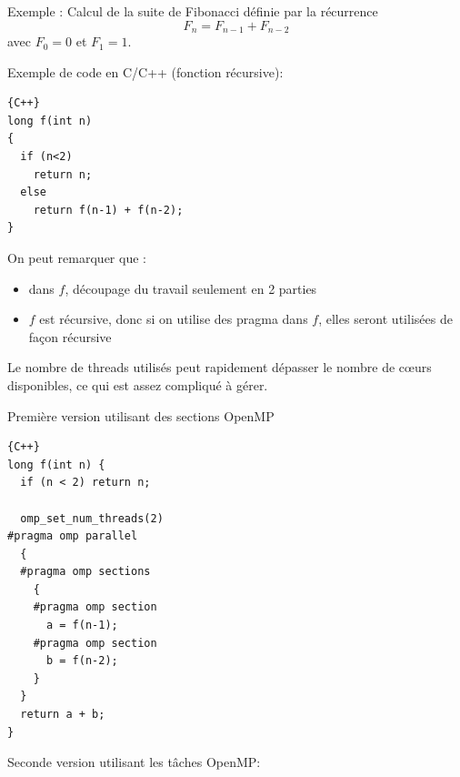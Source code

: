 \documentclass{beamer}
\begin{document}
\begin{frame}[fragile]
Exemple : Calcul de la suite de Fibonacci définie par la récurrence
$$
F_n = F_{n-1} + F_{n-2}
$$
avec $F_0 = 0$ et $F_1 = 1$.

\vfill
Exemple de code en C/C++ (fonction récursive):
 

\begin{lstlisting}{C++}
long f(int n)
{
  if (n<2)
    return n;
  else
    return f(n-1) + f(n-2);
}
\end{lstlisting}

\end{frame}

\begin{frame}[fragile]
\vfill
	On peut remarquer que :
	\begin{itemize}
		\item dans $f$, découpage du travail seulement en 2 parties
		\item $f$ est récursive, donc si on utilise des pragma dans $f$, elles seront utilisées de façon récursive
	\end{itemize}

\bigskip
Le nombre de threads utilisés peut rapidement dépasser le nombre de c\oe urs disponibles, ce qui est assez compliqué à gérer.
\vfill
\end{frame}

\begin{frame}[fragile]
	Première version utilisant des sections OpenMP
	
\begin{lstlisting}{C++}
long f(int n) {
  if (n < 2) return n;
  
  omp_set_num_threads(2)
#pragma omp parallel
  {
  #pragma omp sections
    {
    #pragma omp section
      a = f(n-1);		
    #pragma omp section
      b = f(n-2);
    }
  }
  return a + b;
}
\end{lstlisting}

\vspace{-2cm}\hfill{}
\end{frame}

\begin{frame}
	Seconde version utilisant les tâches OpenMP:
\end{frame}
\end{document}
